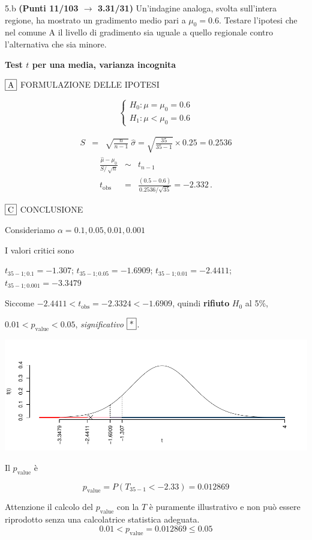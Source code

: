 \documentclass[
  11pt,
]{book}
\theoremstyle{mytheoremstyle}
\theoremstyle{mydefstyle}
\newenvironment{sol}
  {
  \begin{tcolorbox}[enhanced,breakable,arc=0.1mm,boxrule=1pt,colback=white,colframe=iblue,
  title=\bf \fontfamily{lmss}\selectfont \hspace{.5 cm} Soluzione,drop fuzzy shadow]

}{
\end{tcolorbox}
  }
\begin{document}
5.b \textbf{(Punti 11/103 \(\rightarrow\) 3.31/31)} Un'indagine analoga, svolta sull'intera regione, ha mostrato un gradimento medio pari a \(\mu_0=0.6\). Testare l'ipotesi che nel comune A il livello di gradimento sia uguale a quello regionale contro l'alternativa che sia minore.

\begin{sol}
\textbf{Test \(t\) per una media, varianza incognita}

\(\fbox{A}\) FORMULAZIONE DELLE IPOTESI

\[\begin{cases}
   H_0: \mu = \mu_0=0.6 \\
   H_1: \mu < \mu_0=0.6 
   \end{cases}\]

\begin{eqnarray*}
   S    &=& \sqrt{\frac{n} {n-1}}\ \widehat{\sigma} 
   =  \sqrt{\frac{ 35 } { 35 -1}} \times  0.25  =  0.2536 
   \end{eqnarray*}
\begin{eqnarray*}
   \frac{\hat\mu - \mu_{0}} {S/\,\sqrt{n}}&\sim&t_{n-1}\\
   t_{\text{obs}}
   &=& \frac{ ( 0.5 -  0.6 )} { 0.2536 /\sqrt{ 35 }}
   =   -2.332 \, .
   \end{eqnarray*}

\(\fbox{C}\) CONCLUSIONE

Consideriamo \(\alpha=0.1, 0.05, 0.01, 0.001\)

I valori critici sono

\(t_{35-1;0.1}=-1.307\); \(t_{35-1;0.05}=-1.6909\); \(t_{35-1;0.01}=-2.4411\); \(t_{35-1;0.001}=-3.3479\)

Siccome \(-2.4411<t_\text{obs}=-2.3324<-1.6909\), quindi \textbf{rifiuto} \(H_0\) al 5\%,

\(0.01<p_\text{value}<0.05\), \emph{significativo} \(\fbox{*}\).

\begin{center}\includegraphics{Esami_passati_con_soluzioni_files/figure-latex/2023-53,-1} \end{center}

Il \(p_{\text{value}}\) è

\[ p_{\text{value}} = P(T_{35-1}<-2.33)=0.012869 \]

Attenzione il calcolo del \(p_\text{value}\) con la \(T\) è puramente illustrativo e non può essere riprodotto senza una calcolatrice statistica adeguata.\[
 0.01 < p_\text{value}= 0.012869 \leq 0.05 
\]

\end{sol}
\end{document}
